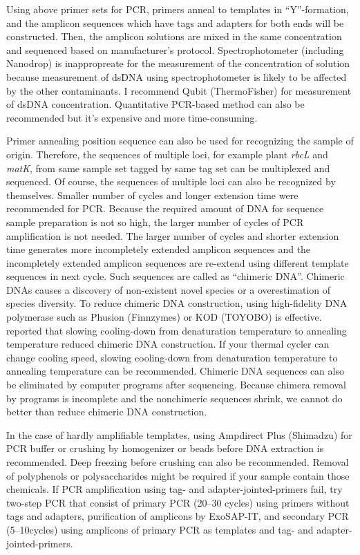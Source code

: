 \documentclass[titlepage,10pt,a4paper,english]{jsbook}
\begin{document}
Using above primer sets for PCR, primers anneal to templates in ``Y''-formation, and the amplicon sequences which have tags and adapters for both ends will be constructed.
Then, the amplicon solutions are mixed in the same concentration and sequenced based on manufacturer's protocol.
Spectrophotometer (including Nanodrop) is inappropreate for the measurement of the concentration of solution because measurement of dsDNA using spectrophotometer is likely to be affected by the other contaminants.
I recommend Qubit (ThermoFisher) for measurement of dsDNA concentration.
Quantitative PCR-based method can also be recommended but it's expensive and more time-consuming.

Primer annealing position sequence can also be used for recognizing the sample of origin.
Therefore, the sequences of multiple loci, for example plant \textit{rbcL} and \textit{matK}, from same sample set tagged by same tag set can be multiplexed and sequenced.
Of course, the sequences of multiple loci can also be recognized by themselves.
Smaller number of cycles and longer extension time were recommended for PCR.
Because the required amount of DNA for sequence sample preparation is not so high, the larger number of cycles of PCR amplification is not needed.
The larger number of cycles and shorter extension time generates more incompletely extended amplicon sequences and the incompletely extended amplicon sequences are re-extend using different template sequences in next cycle.
Such sequences are called as ``chimeric DNA''.
Chimeric DNAs causes a discovery of non-existent novel species or a overestimation of species diversity.
To reduce chimeric DNA construction, using high-fidelity DNA polymerase such as Phusion (Finnzymes) or KOD (TOYOBO) is effective.
\citet{Stevens2013} reported that slowing cooling-down from denaturation temperature to annealing temperature reduced chimeric DNA construction.
If your thermal cycler can change cooling speed, slowing cooling-down from denaturation temperature to annealing temperature can be recommended.
Chimeric DNA sequences can also be eliminated by computer programs after sequencing.
Because chimera removal by programs is incomplete and the nonchimeric sequences shrink, we cannot do better than reduce chimeric DNA construction.

In the case of hardly amplifiable templates, using Ampdirect Plus (Shimadzu) for PCR buffer or crushing by homogenizer or beads before DNA extraction is recommended.
Deep freezing before crushing can also be recommended.
Removal of polyphenols or polysaccharides might be required if your sample contain those chemicals.
If PCR amplification using tag- and adapter-jointed-primers fail, try two-step PCR that consist of primary PCR (20--30 cycles) using primers without tags and adapters, purification of amplicons by ExoSAP-IT, and secondary PCR (5--10cycles) using amplicons of primary PCR as templates and tag- and adapter-jointed-primers.
\end{document}
